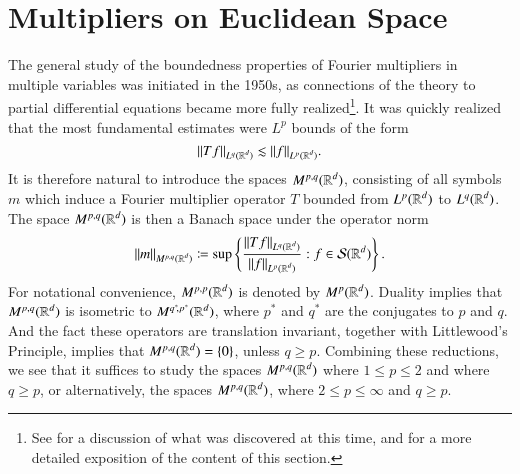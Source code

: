 \section{Multipliers on Euclidean Space}

The general study of the boundedness properties of Fourier multipliers in multiple variables was initiated in the 1950s, as connections of the theory to partial differential equations became more fully realized\footnote{See \cite{Hormander1} for a discussion of what was discovered at this time, and for a more detailed exposition of the content of this section.}. It was quickly realized that the most fundamental estimates were $L^p$ bounds of the form
%
\[ \| Tf \|_{L^q(\operatorname{\mathbb{R}}^d)} \lesssim \| f \|_{L^p(\operatorname{\mathbb{R}}^d)}. \]
%
%
%
It is therefore natural to introduce the spaces $M^{p,q}(\operatorname{\mathbb{R}}^d)$, consisting of all symbols $m$ which induce a Fourier multiplier operator $T$ bounded from $L^p(\operatorname{\mathbb{R}}^d)$ to $L^q(\operatorname{\mathbb{R}}^d)$. The space $M^{p,q}(\operatorname{\mathbb{R}}^d)$ is then a Banach space under the operator norm
%
\[ \| m \|_{M^{p,q}(\operatorname{\mathbb{R}}^d)} \coloneqq \sup \left\{ \frac{\| T f \|_{L^q(\operatorname{\mathbb{R}}^d)}}{\| f \|_{L^p(\operatorname{\mathbb{R}}^d)}} : f \in \mathcal{S}(\operatorname{\mathbb{R}}^d) \right\}. \]
%
For notational convenience, $M^{p,p}(\operatorname{\mathbb{R}}^d)$ is denoted by $M^p(\operatorname{\mathbb{R}}^d)$. Duality implies that $M^{p,q}(\operatorname{\mathbb{R}}^d)$ is isometric to $M^{q^* \negmedspace ,p^*}(\operatorname{\mathbb{R}}^d)$, where $p^*$ and $q^*$ are the conjugates to $p$ and $q$. And the fact these operators are translation invariant, together with Littlewood's Principle, implies that $M^{p,q}(\operatorname{\mathbb{R}}^d) = \{ 0 \}$, unless $q \geq p$. Combining these reductions, we see that it suffices to study the spaces $M^{p,q}(\operatorname{\mathbb{R}}^d)$ where $1 \leq p \leq 2$ and where $q \geq p$, or alternatively, the spaces $M^{p,q}(\operatorname{\mathbb{R}}^d)$, where $2 \leq p \leq \infty$ and $q \geq p$.

